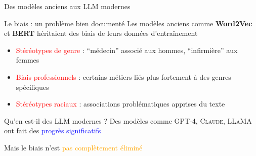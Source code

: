 \begin{frame}{Des modèles anciens aux LLM modernes}

    \begin{block}{Le biais : un problème bien documenté}
        \medskip
        Les modèles anciens comme \textbf{Word2Vec} et \textbf{BERT} héritaient des biais de leurs données d'entraînement
        \begin{itemize}
            \item<+-> \textcolor{red}{Stéréotypes de genre} : ``médecin'' associé aux hommes, ``infirmière'' aux femmes
            \item<+-> \textcolor{red}{Biais professionnels} : certains métiers liés plus fortement à des genres spécifiques
            \item<+-> \textcolor{red}{Stéréotypes raciaux} : associations problématiques apprises du texte
        \end{itemize}
    \end{block}

    \bigskip

    \begin{overprint}
        \begin{block}{Qu'en est-il des LLM modernes ?}
            \medskip
            Des modèles comme \textsc{GPT-4}, \textsc{Claude}, \textsc{LLaMA} ont fait des \textcolor{blue}{progrès significatifs}

            \medskip

            Mais le biais n'est \textcolor{orange}{pas complètement éliminé}
        \end{block}
    \end{overprint}

\end{frame}


